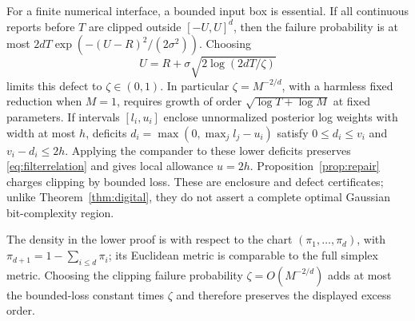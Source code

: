 For a finite numerical interface, a bounded input box is essential. If all continuous reports before $T$ are clipped outside $[-U,U]^d$, then the failure probability is at most $2dT\exp(-(U-R)^2/(2\sigma^2))$. Choosing
\begin{equation}\label{eq:clipping}
 U=R+\sigma\sqrt{2\log(2dT/\zeta)}
\end{equation}
limits this defect to $\zeta\in(0,1)$. In particular $\zeta=M^{-2/d}$, with a harmless fixed reduction when $M=1$, requires growth of order $\sqrt{\log T+\log M}$ at fixed parameters. If intervals $[l_i,u_i]$ enclose unnormalized posterior log weights with width at most $h$, deficits $d_i=\max(0,\max_jl_j-u_i)$ satisfy $0\le d_i\le v_i$ and $v_i-d_i\le2h$. Applying the compander to these lower deficits preserves \eqref{eq:filterrelation} and gives local allowance $u=2h$. Proposition~\ref{prop:repair} charges clipping by bounded loss. These are enclosure and defect certificates; unlike Theorem~\ref{thm:digital}, they do not assert a complete optimal Gaussian bit-complexity region.

The density in the lower proof is with respect to the chart $(\pi_1,\ldots,\pi_d)$, with $\pi_{d+1}=1-\sum_{i\le d}\pi_i$; its Euclidean metric is comparable to the full simplex metric. Choosing the clipping failure probability $\zeta=O(M^{-2/d})$ adds at most the bounded-loss constant times $\zeta$ and therefore preserves the displayed excess order.

